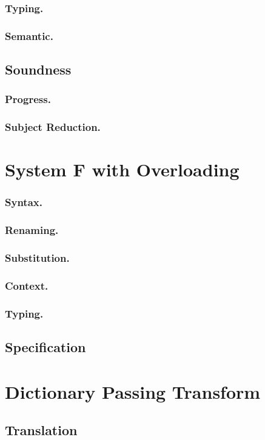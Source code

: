 \documentclass[runningheads]{llncs}
\begin{document}
\subsubsection{Typing.}
\subsubsection{Semantic.}
\subsection{Soundness}
\subsubsection{Progress.}
\subsubsection{Subject Reduction.}
\section{System F with Overloading}
\subsubsection{Syntax.} 
\subsubsection{Renaming.}
\subsubsection{Substitution.}
\subsubsection{Context.}
\subsubsection{Typing.}
\subsection{Specification}
\section{Dictionary Passing Transform}
\subsection{Translation}
\end{document}
